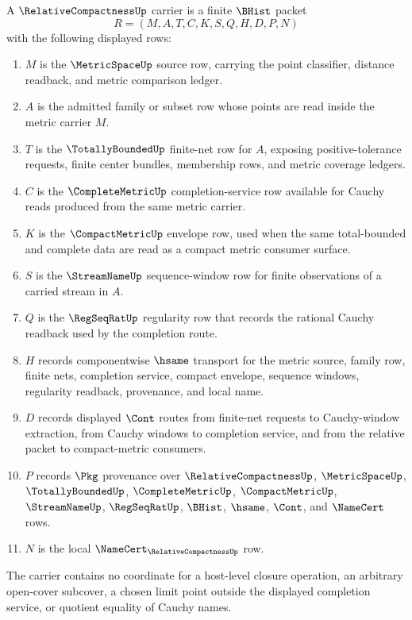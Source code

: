\begin{definition}
\label{def:relative-compactness-carrier}
A $\RelativeCompactnessUp$ carrier is a finite $\BHist$ packet
$$
R=(M,A,T,C,K,S,Q,H,D,P,N)
$$
with the following displayed rows:
\begin{enumerate}
\item $M$ is the $\MetricSpaceUp$ source row, carrying the point classifier, distance readback, and metric comparison ledger.
\item $A$ is the admitted family or subset row whose points are read inside the metric carrier $M$.
\item $T$ is the $\TotallyBoundedUp$ finite-net row for $A$, exposing positive-tolerance requests, finite center bundles, membership rows, and metric coverage ledgers.
\item $C$ is the $\CompleteMetricUp$ completion-service row available for Cauchy reads produced from the same metric carrier.
\item $K$ is the $\CompactMetricUp$ envelope row, used when the same total-bounded and complete data are read as a compact metric consumer surface.
\item $S$ is the $\StreamNameUp$ sequence-window row for finite observations of a carried stream in $A$.
\item $Q$ is the $\RegSeqRatUp$ regularity row that records the rational Cauchy readback used by the completion route.
\item $H$ records componentwise $\hsame$ transport for the metric source, family row, finite nets, completion service, compact envelope, sequence windows, regularity readback, provenance, and local name.
\item $D$ records displayed $\Cont$ routes from finite-net requests to Cauchy-window extraction, from Cauchy windows to completion service, and from the relative packet to compact-metric consumers.
\item $P$ records $\Pkg$ provenance over $\RelativeCompactnessUp$, $\MetricSpaceUp$, $\TotallyBoundedUp$, $\CompleteMetricUp$, $\CompactMetricUp$, $\StreamNameUp$, $\RegSeqRatUp$, $\BHist$, $\hsame$, $\Cont$, and $\NameCert$ rows.
\item $N$ is the local $\NameCert_{\RelativeCompactnessUp}$ row.
\end{enumerate}
The carrier contains no coordinate for a host-level closure operation, an arbitrary open-cover subcover, a chosen limit point outside the displayed completion service, or quotient equality of Cauchy names.
\end{definition}

